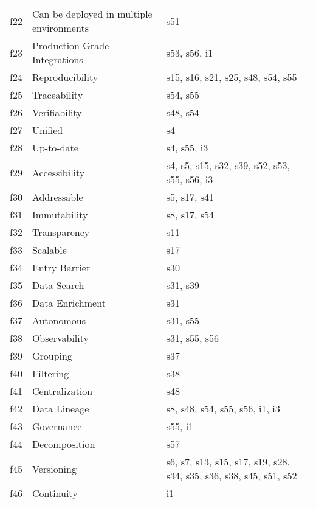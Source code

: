 \begin{tabular}{|c|p{}|p{}|}
f22 & Can be deployed in multiple environments & \cellcolor{emerald_shape_1} {s51}\\
f23 & Production Grade Integrations & \cellcolor{emerald_shape_2} {s53, s56, i1}\\
f24 & Reproducibility & \cellcolor{emerald_shape_3} {s15, s16, s21, s25, s48, s54, s55}\\
f25 & Traceability & \cellcolor{emerald_shape_1} {s54, s55}\\
f26 & Verifiability & \cellcolor{emerald_shape_1} {s48, s54}\\
f27 & Unified & \cellcolor{emerald_shape_1} {s4}\\
f28 & Up-to-date & \cellcolor{emerald_shape_2} {s4, s55, i3}\\
f29 & Accessibility & \cellcolor{emerald_shape_3} {s4, s5, s15, s32, s39, s52, s53, s55, s56, i3}\\
f30 & Addressable & \cellcolor{emerald_shape_2} {s5, s17, s41}\\
f31 & Immutability & \cellcolor{emerald_shape_2} {s8, s17, s54}\\
f32 & Transparency & \cellcolor{emerald_shape_1} {s11}\\
f33 & Scalable & \cellcolor{emerald_shape_1} {s17}\\
f34 & Entry Barrier & \cellcolor{emerald_shape_1} {s30}\\
f35 & Data Search & \cellcolor{emerald_shape_1} {s31, s39}\\
f36 & Data Enrichment & \cellcolor{emerald_shape_1} {s31}\\
f37 & Autonomous & \cellcolor{emerald_shape_1} {s31, s55}\\
f38 & Observability & \cellcolor{emerald_shape_2} {s31, s55, s56}\\
f39 & Grouping & \cellcolor{emerald_shape_1} {s37}\\
f40 & Filtering & \cellcolor{emerald_shape_1} {s38}\\
f41 & Centralization & \cellcolor{emerald_shape_1} {s48}\\
f42 & Data Lineage & \cellcolor{emerald_shape_3} {s8, s48, s54, s55, s56, i1, i3}\\
f43 & Governance & \cellcolor{emerald_shape_1} {s55, i1}\\
f44 & Decomposition & \cellcolor{emerald_shape_1} {s57}\\
f45 & Versioning & \cellcolor{emerald_shape_4} {s6, s7, s13, s15, s17, s19, s28, s34, s35, s36, s38, s45, s51, s52}\\
f46 & Continuity & \cellcolor{emerald_shape_1} {i1}\\

\end{tabular}
